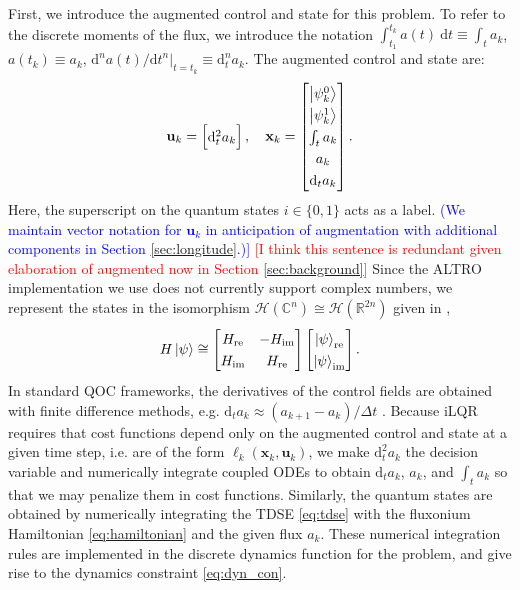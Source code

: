 First, we introduce the augmented control and state for this problem.
To refer to the discrete moments of the flux, we introduce the notation
$\int^{t_{k}}_{t_{1}} a(t) \ \mathrm{d}t \equiv \int_{t} a_{k}$,
$a(t_{k}) \equiv a_{k}$,
$\mathrm{d}^{n}a(t)/{\mathrm{d}t}^{n} \lvert_{t = t_{k}} \equiv \mathrm{d}^{n}_{t} a_{k}$.
The augmented control and state are:
\begin{equation}
  \begingroup
  \renewcommand*{\arraystretch}{1.3}
  \mathbf{u}_{k} = \begin{bmatrix} \mathrm{d}^{2}_{t} a_{k} \end{bmatrix}, \quad
  \mathbf{x}_{k} = \begin{bmatrix} \ket{\psi^{0}_{k}} \\ \ket{\psi^{1}_{k}}
    \\ \int_{t} a_{k} \\ a_{k} \\ \mathrm{d}_{t} a_{k} \end{bmatrix}.
  \endgroup
  \label{eq:astatecontrols}
\end{equation}
Here, the superscript on the quantum states $i \in \{0, 1\}$ acts as a label.
\textcolor{blue}{(We maintain vector notation for $\mathbf{u}_k$ in anticipation
  of augmentation with additional components in Section \ref{sec:longitude}.)]}
\textcolor{red}{[I think this sentence is redundant given
    elaboration of augmented now in Section \ref{sec:background}]}
Since the ALTRO implementation we use does not currently
support complex numbers, we represent the states
in the isomorphism $\mathcal{H}(\mathbb{C}^{n})
\cong \mathcal{H}(\mathbb{R}^{2n})$ given in \cite{leung2017speedup},
\begin{equation}
  H \ket{\psi} \cong \begin{bmatrix} H_{\textrm{re}} & -H_{\textrm{im}}
    \\ H_{\textrm{im}} & H_{\textrm{re}}\end{bmatrix}
  \begin{bmatrix} \ket{\psi}_{\textrm{re}} \\ \ket{\psi}_{\textrm{im}}\end{bmatrix}.
  \label{eq:isomorphism}
\end{equation}
In standard QOC frameworks, the derivatives of the control fields
are obtained with finite difference methods, e.g.
$\mathrm{d}_{t} a_{k} \approx (a_{k + 1} - a_{k}) / \Delta t$ \cite{leung2017speedup}.
Because iLQR requires that cost functions depend only on the augmented control and state at a given
time step, i.e. are of the form $\ell_{k}(\mathbf{x}_{k}, \mathbf{u}_{k})$,
we make $\mathrm{d}^{2}_{t} a_{k}$ the decision variable and
numerically integrate coupled ODEs to obtain $\mathrm{d}_{t} a_{k}$, $a_{k}$, and $\int_{t} a_{k}$
so that we may penalize them in cost functions.
Similarly, the quantum states are obtained by numerically integrating
the TDSE \eqref{eq:tdse} with the fluxonium Hamiltonian \eqref{eq:hamiltonian}
and the given flux $a_{k}$. These numerical integration rules are implemented
in the discrete dynamics function for the problem, and give rise to the
dynamics constraint \eqref{eq:dyn_con}.

